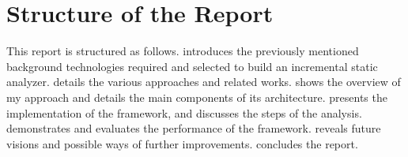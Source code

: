 \section{Structure of the Report}

This report is structured as follows.
 introduces the previously mentioned background technologies required and selected to build an incremental static analyzer.
 details the various approaches and related works.
 shows the overview of my approach and details the main components of its architecture.
 presents the implementation of the framework, and discusses the steps of the analysis.
 demonstrates and evaluates the performance of the framework.
 reveals future visions and possible ways of further improvements.
 concludes the report.
